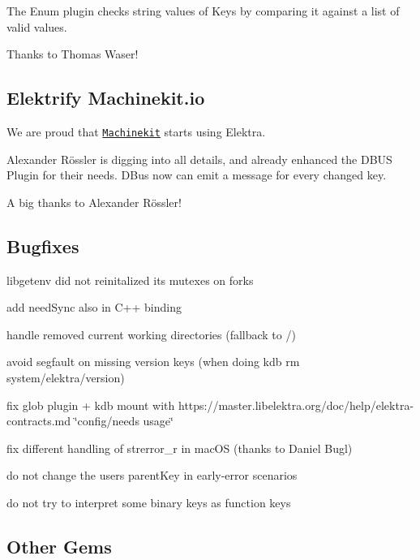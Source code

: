 The Enum plugin checks string values of Keys by comparing it against a list of valid values.

Thanks to Thomas Waser!

\subsection*{Elektrify Machinekit.\+io}

We are proud that \href{http://www.machinekit.io/}{\tt Machinekit} starts using Elektra.

Alexander Rössler is digging into all details, and already enhanced the D\+B\+US Plugin for their needs. D\+Bus now can emit a message for every changed key.

A big thanks to Alexander Rössler!

\subsection*{Bugfixes}


\begin{DoxyItemize}
\item libgetenv did not reinitalized its mutexes on forks
\item add need\+Sync also in C++ binding
\item handle removed current working directories (fallback to /)
\item avoid segfault on missing version keys (when doing {\ttfamily kdb rm system/elektra/version})
\item fix glob plugin + kdb mount with https\+://master.libelektra.\+org/doc/help/elektra-\/contracts.md \char`\"{}config/needs usage\char`\"{}
\item fix different handling of strerror\+\_\+r in mac\+OS (thanks to Daniel Bugl)
\item do not change the users parent\+Key in early-\/error scenarios
\item do not try to interpret some binary keys as function keys
\end{DoxyItemize}

\subsection*{Other Gems}


